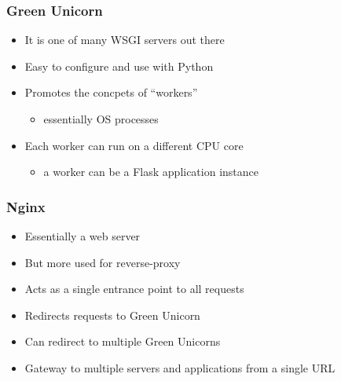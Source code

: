 \documentclass{beamer}
\begin{document}
\begin{frame}
\frametitle<presentation>{Green Unicorn}


\begin{itemize}
  \item It is one of many WSGI servers out there
  \item Easy to configure and use with Python
  \item Promotes the concpets of ``workers''
  \begin{itemize} \item essentially OS processes \end{itemize}
  \item Each worker can run on a different CPU core
  \begin{itemize} \item a worker can be a Flask application instance
  \end{itemize}
\end{itemize}

\end{frame}

\begin{frame}
\frametitle<presentation>{Nginx}


\begin{itemize}
  \item Essentially a web server
  \item But more used for reverse-proxy
  \item Acts as a single entrance point to all requests
  \item Redirects requests to Green Unicorn
  \item Can redirect to multiple Green Unicorns
  \item Gateway to multiple servers and applications from a single URL 
\end{itemize}

\end{frame}
\end{document}
